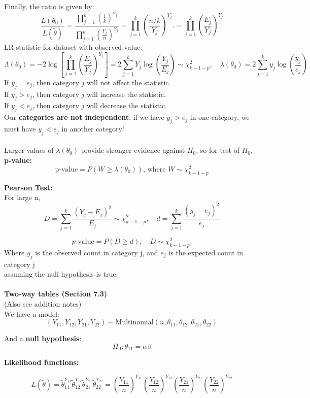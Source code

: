 \documentclass[a4paper,12pt]{article}
\begin{document}
Finally, the ratio is given by:
\[
\frac{L(\theta_0)}{L(\tilde{\theta})} =
\frac{\prod_{j=1}^k \left(\frac{1}{k}\right)^{Y_j}} {\prod_{j=1}^k \left(\frac{Y_j}{n}\right)^{Y_j}} =
\prod_{j=1}^k \left(\frac{n/k}{Y_j}\right)^{Y_j}. 
 = \prod_{j=1}^k \left( \frac{E_j}{Y_j} \right)^{Y_j}
\]
LR statistic for dataset with observed value:
\[
\Lambda(\theta_0) = -2 \log \left[ \prod_{j=1}^k \left( \frac{E_j}{Y_j} \right)^{Y_j} \right] 
= 2 \sum_{j=1}^k Y_j \log \left( \frac{Y_j}{E_j} \right) \sim \chi^2_{k-1-p}, \quad
\lambda(\theta_0) = 2 \sum_{j=1}^{k} y_j \log \left( \frac{y_j}{e_j} \right)
\]
If \( y_j = e_j \), then category \( j \) will not affect the statistic. \\
If \( y_j > e_j \), then category \( j \) will increase the statistic. \\
If \( y_j < e_j \), then category \( j \) will decrease the statistic. \\
Our \textbf{categories are not independent}: if we have \( y_j > e_j \) in one category, we must have \( y_j < e_j \) in another category!
\\
\\Larger values of $\lambda(\theta_0)$ provide stronger evidence against $H_0$, so for test of $H_0$,
\textbf{p-value:}
\[
\text{p-value} = P(W \geq \lambda(\theta_0)), \, \text{where } W \sim \chi^2_{k-1-p}
\]

\bigskip
\textbf{Pearson Test:}
\\For large n, \[D = \sum_{j=1}^{k} \frac{(Y_j - E_j)^2}{E_j} \sim \chi^2_{k-1-p}, \quad
d = \sum_{j=1}^{k} \frac{(y_j - e_j)^2}{e_j}
\]

\[
p\text{-value} = P(D \geq d), \quad D \sim \chi^2_{k-1-p}.
\]
Where $y_j$ is the observed count in category j, and $e_j$ is the
expected count in category j 
\\assuming the null hypothesis  is true.
\\
\\\textbf{Two-way tables (Section 7.3)}
\\ (Also see addition notes)
\\We have a model:
\[
(Y_{11}, Y_{12}, Y_{21}, Y_{22}) \sim \text{Multinomial}(n, \theta_{11}, \theta_{12}, \theta_{21}, \theta_{22})
\]

And a\textbf{ null hypothesis}: 
\[
H_0 : \theta_{11} = \alpha \beta
\]

\textbf{Likelihood functions:}

\[
L(\tilde{\theta}) = \tilde{\theta}_{11}^{Y_{11}} \tilde{\theta}_{12}^{Y_{12}} \tilde{\theta}_{21}^{Y_{21}} \tilde{\theta}_{22}^{Y_{22}}
= 
\left( \frac{Y_{11}}{n} \right)^{Y_{11}}
\left( \frac{Y_{12}}{n} \right)^{Y_{12}}
\left( \frac{Y_{21}}{n} \right)^{Y_{21}}
\left( \frac{Y_{22}}{n} \right)^{Y_{22}}
\]
\end{document}
